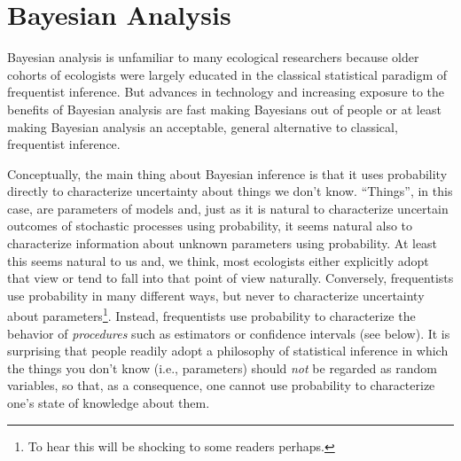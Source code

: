 


\section{Bayesian Analysis}

Bayesian analysis is unfamiliar to many ecological researchers because
older cohorts of ecologists were largely educated in the classical
statistical paradigm of frequentist inference. But advances in
technology and increasing exposure to the benefits of Bayesian analysis
are fast making Bayesians out of people or at least making Bayesian
analysis an acceptable, general alternative to classical, frequentist
inference.

Conceptually, the main thing about Bayesian inference is that it uses
probability directly to characterize uncertainty about things we don't
know.  ``Things'', in this case, are parameters of models and, just as
it is natural to characterize uncertain outcomes of stochastic
processes using probability, it seems natural also to characterize
information about unknown parameters using probability. At least
this seems natural to us and, we think, most ecologists either
explicitly adopt that view or tend to fall into that point of view
naturally.  Conversely, frequentists use probability in many different
ways, but never to characterize uncertainty about
parameters\footnote{To hear this will be shocking to some readers
  perhaps.}. Instead, frequentists use probability to characterize the
behavior of {\it procedures} such as estimators or confidence
intervals (see below). It is surprising that people readily
adopt a philosophy of statistical inference in which the things you
don't know (i.e., parameters) should {\it not} be regarded as random
variables, so that, as a consequence, one cannot use probability to
characterize one's state of knowledge about them.


